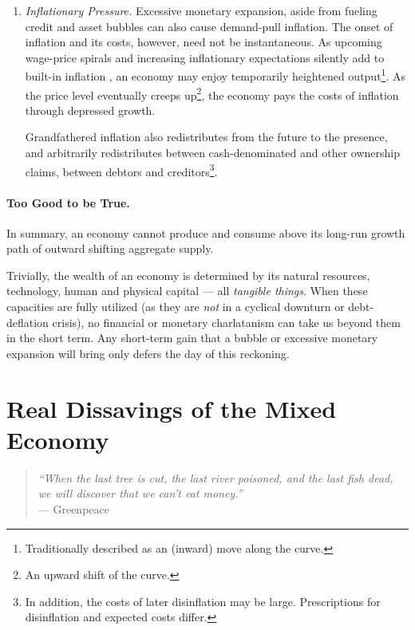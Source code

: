 \begin{enumerate}
	\item {} \label{itm:inflationary-pressure} \emph{Inflationary Pressure.} Excessive monetary expansion, aside from fueling credit and asset bubbles can also cause demand-pull inflation. The onset of inflation and its costs, however, need not be instantaneous. As upcoming wage-price spirals and increasing inflationary expectations silently add to built-in inflation \citep{Gordon1988}, an economy may enjoy temporarily  heightened output\footnote{
		Traditionally described as an (inward) move along the \cite{Phillips1958} curve.}. 
	As the price level eventually creeps up\footnote{
		An upward shift of the \cite{Phillips1958} curve.}, 
	the economy pays the costs of inflation through depressed growth.

	Grandfathered inflation also redistributes from the future to the presence, and arbitrarily redistributes between cash-denominated and other ownership claims, between debtors and creditors\footnote{
		In addition, the costs of later disinflation may be large. Prescriptions for disinflation and expected costs differ.}.%
\end{enumerate}

\paragraph[Too Good To Be True]{Too Good to be True.}
In summary, an economy cannot produce and consume above its long-run growth path of outward shifting aggregate supply. 

Trivially, the wealth of an economy is determined by its natural resources, technology, human and physical capital --- all \emph{tangible things}. When these capacities are fully utilized (as they are \emph{not} in a cyclical downturn or debt-deflation crisis), no financial or monetary charlatanism can take us beyond them in the short term. Any short-term gain that a bubble or excessive monetary expansion will bring only defers the day of this reckoning.

\section[Real Dissavings]{Real Dissavings of the Mixed Economy} \label{sec:real-dissavings}

\begin{quote}
	\emph{``When the last tree is cut, the last river poisoned, and the last fish dead, we will discover that we can't eat money.''\\}
	--- Greenpeace
\end{quote}


